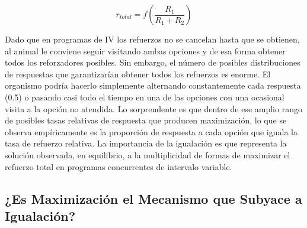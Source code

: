 \documentclass[
  letterpaper,
]{book}
\begin{document}
\[
r_{total}= f\left(\frac{R_1}{R_1 + R_2}\right)
\]

Dado que en programas de IV los refuerzos no se cancelan hasta que se
obtienen, al animal le conviene seguir visitando ambas opciones y de esa
forma obtener todos los reforzadores posibles. Sin embargo, el número de
posibles distribuciones de respuestas que garantizarían obtener todos
los refuerzos es enorme. El organismo podría hacerlo simplemente
alternando constantemente cada respuesta (0.5) o pasando casi todo el
tiempo en una de las opciones con una ocasional visita a la opción no
atendida. Lo sorprendente es que dentro de ese amplio rango de posibles
tasas relativas de respuesta que producen maximización, lo que se
observa empíricamente es la proporción de respuesta a cada opción que
iguala la tasa de refuerzo relativa. La importancia de la igualación es
que representa la solución observada, en equilibrio, a la multiplicidad
de formas de maximizar el refuerzo total en programas concurrentes de
intervalo variable.

\subsection{¿Es Maximización el Mecanismo que Subyace a
Igualación?}\label{es-maximizaciuxf3n-el-mecanismo-que-subyace-a-igualaciuxf3n}
\end{document}
